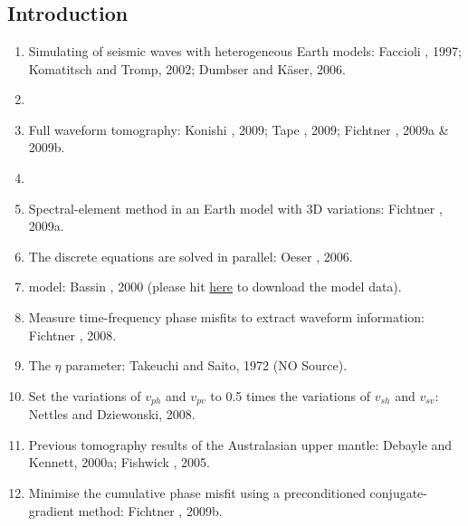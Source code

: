 \renewcommand{\pmk}{Fichtner\_2010\_EPSL\_Full waveform tomography}
\renewcommand{\prf}{FWI/\pmk.pdf}
\renewcommand{\pti}{Full waveform tomography for radially anisotropic structure:
New insights into present and past states of the Australasian upper mantle}
\renewcommand{\pay}{Andreas Fichtner, Brian L. N. Kennett and Heiner Igel \etal, 2010}
\renewcommand{\pjo}{Earth and Planetary Science Letters}
\renewcommand{\pda}{2016/10/13 Thu.}

\section{\pinfo}
\subsection{Introduction}
\begin{enumerate}[\hspace{10mm}*]
  \item Simulating of seismic waves with heterogeneous Earth models: Faccioli \etal, 1997;
    Komatitsch and Tromp, 2002; Dumbser and K\"{a}ser, 2006.
  \item \sline
  \item Full waveform tomography: Konishi \etal, 2009; Tape \etal, 2009;
    Fichtner \etal, 2009a \& 2009b.
  \item \sline
  \item Spectral-element method in an Earth model with 3D variations: Fichtner \etal, 2009a.
  \item The discrete equations are solved in parallel: Oeser \etal, 2006.
  \item {} model: Bassin \etal, 2000
    (please hit \href{http://igppweb.ucsd.edu/~gabi/crust2.html}{here} to download the model data).
  \item Measure time-frequency phase misfits to extract waveform information: Fichtner \etal, 2008.
  \item The $\eta$ parameter: Takeuchi and Saito, 1972 (NO Source).
  \item Set the variations of $v_{ph}$ and $v_{pv}$ to 0.5 times
    the variations of $v_{sh}$ and $v_{sv}$: Nettles and Dziewonski, 2008.
  \item Previous tomography results of the Australasian upper mantle:
    Debayle and Kennett, 2000a; Fishwick \etal, 2005.
  \item Minimise the cumulative phase misfit using a preconditioned conjugate-gradient method:
    Fichtner \etal, 2009b.

\end{enumerate}
